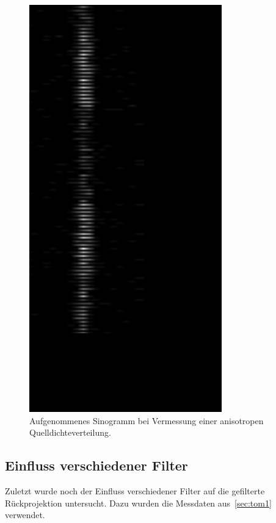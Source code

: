 \documentclass[slug=PET, room=Andreas-Schubert-Bau\,\ 424A, supervisor=Carsten\ Bittrich, coursedate=10.\ 01.\ 2020]{../../Lab_Report_LaTeX/lab_report}
\begin{document}
\begin{figure}[h]
	\centering
	\includegraphics[width=.3\textwidth, angle=90]{../messungen/Tom2/tom2_Sinogramm.PNG}
	\caption{Aufgenommenes Sinogramm bei Vermessung einer anisotropen Quelldichteverteilung.}
	\label{fig:tom2}
\end{figure}

\subsection{Einfluss verschiedener Filter}
\label{sec:filter}

Zuletzt wurde noch der Einfluss verschiedener Filter auf die gefilterte Rückprojektion
untersucht. Dazu wurden die Messdaten aus~\ref{sec:tom1} verwendet.
\end{document}
